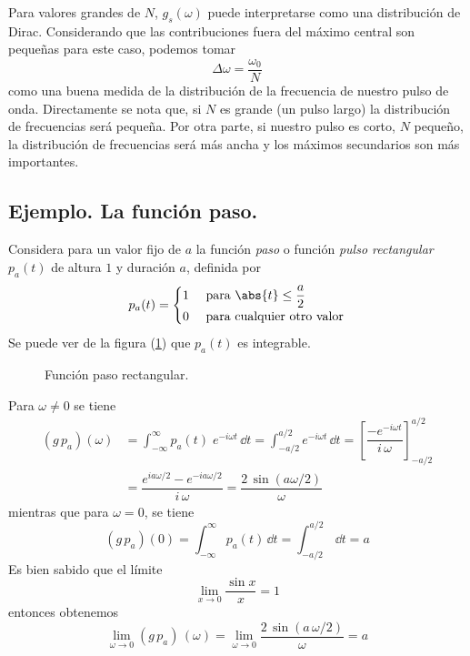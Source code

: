 Para valores grandes de $N$, $g_{s}(\omega)$ puede interpretarse como una distribución de Dirac. Considerando que las contribuciones fuera del máximo central son pequeñas para este caso, podemos tomar
\begin{equation}
\Delta \omega = \dfrac{\omega_{0}}{N}
\label{eq:ecuacion_15_32}
\end{equation}
como una buena medida de la distribución de la frecuencia de nuestro pulso de onda. Directamente se nota que, si $N$ es grande (un pulso largo) la distribución de frecuencias será pequeña. Por otra parte, si nuestro pulso es corto, $N$ pequeño, la distribución de frecuencias será más ancha y los máximos secundarios son más importantes.
\subsection*{Ejemplo. La función paso.}
Considera para un valor fijo de $a$ la función \emph{paso} o función \emph{pulso rectangular} $p_{a}(t)$ de altura $1$ y duración $a$, definida por
\begin{equation}
p_{a}(t) = \begin{cases}
1 & \text{ para } \abs{t} \leq \dfrac{a}{2} \\
0 & \text{ para cualquier otro valor} \end{cases}
\label{eq:ecuacion_06_10_Beerends}
\end{equation}
Se puede ver de la figura (\ref{fig:figura_funcionpaso}) que $p_{a}(t)$ es integrable.
\begin{figure}[H]
\centering

\caption{Función paso rectangular.}
\label{fig:figura_funcionpaso}
\end{figure}
Para $\omega \neq 0$ se tiene
\begin{align*}
(g \, p_{a}) (\omega) &= \int_{-\infty}^{\infty} p_{a}(t) \; e^{-i \omega t} \, \dd t = \int_{-a/2}^{a/2} e^{-i \omega t} \, \dd t = \left[ \dfrac{- e^{- i \omega t}}{i \, \omega} \right]_{-a/2}^{a/2} \\[0.5em]
&= \dfrac{e^{ia\omega/2} - e^{-i a \omega/2}}{i \, \omega} = \dfrac{2 \, \sin (a \omega/2)}{\omega}
\end{align*}
mientras que para $\omega = 0$, se tiene
\begin{equation*}
(g \, p_{a})(0) = \int_{-\infty}^{\infty} p_{a}(t) \, \dd t = \int_{-a/2}^{a/2} \, \dd t = a
\end{equation*}
Es bien sabido que el límite 
\[ \lim_{x \to 0} \dfrac{\sin x}{x} = 1 \]
entonces obtenemos 
\[ \lim_{\omega \to 0}  (g \, p_{a}) \, (\omega) = \lim_{\omega \to 0} \dfrac{2 \, \sin (a \, \omega /2)}{\omega} = a \]
